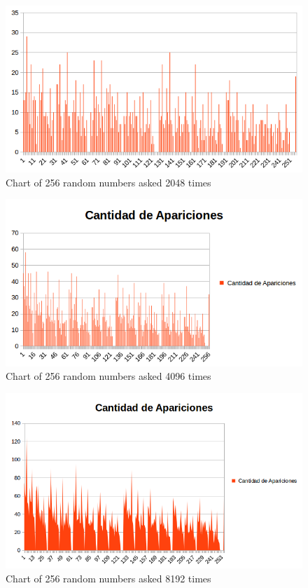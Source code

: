 \documentclass[twocolumn]{IEEEtran}
\begin{document}
\begin{enumerate}
	\begin{figure}[h!]
    \centering
    \includegraphics[width=\columnwidth]{src/256n2048v.png}
	\caption{Chart of 256 random numbers asked 2048 times}
    \label{fig:256n2048v}
    \end{figure}
    
    \begin{figure}[h!]
    \centering
    \includegraphics[width=\columnwidth]{src/256n4096v.png}
	\caption{Chart of 256 random numbers asked 4096 times}
    \label{fig:256n4096v}
    \end{figure}
    \begin{figure}[h!]
    \centering
    \includegraphics[width=\columnwidth]{src/256n8192v.png}
	\caption{Chart of 256 random numbers asked 8192 times}
    \label{fig:256n8192v}
    \end{figure}
    
	\end{enumerate}
\end{document}
